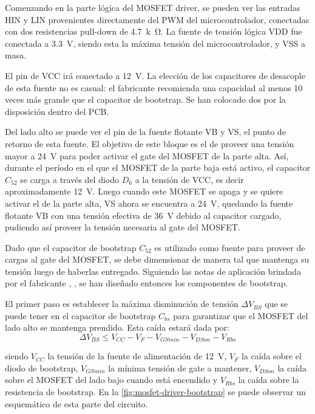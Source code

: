 \documentclass[titlepage, 12pt]{article}
\begin{document}
Comenzando en la parte lógica del MOSFET driver, se pueden ver las entradas HIN y LIN provenientes directamente del PWM del microcontrolador, conectadas con dos resistencias pull-down de \SI{4.7}{k\ohm}. La fuente de tensión lógica VDD fue conectada a \SI{3.3}{V}, siendo esta la máxima tensión del microcontrolador, y VSS a masa.

El pin de VCC irá conectado a \SI{12}{V}. La elección de los capacitores de desacople de esta fuente no es casual: el fabricante recomienda una capacidad al menos 10 veces más grande que el capacitor de bootstrap. Se han colocado dos por la disposición dentro del PCB.

Del lado alto se puede ver el pin de la fuente flotante VB y VS, el punto de retorno de esta fuente. El objetivo de este bloque es el de proveer una tensión mayor a \SI{24}{V} para poder activar el gate del MOSFET de la parte alta. Así, durante el período en el que el MOSFET de la parte baja está activo, el capacitor $C_{52}$ se carga a través del diodo $D_6$ a la tensión de VCC, es decir aproximadamente \SI{12}{V}. Luego cuando este MOSFET se apaga y se quiere activar el de la parte alta, VS ahora se encuentra a \SI{24}{V}, quedando la fuente flotante VB con una tensión efectiva de \SI{36}{V} debido al capacitor cargado, pudiendo así proveer la tensión necesaria al gate del MOSFET.

Dado que el capacitor de bootstrap $C_{52}$ es utilizado como fuente para proveer de cargas al gate del MOSFET, se debe dimensionar de manera tal que mantenga su tensión luego de haberlas entregado. Siguiendo las notas de aplicación brindada por el fabricante \cite{ir:dt04-04}, \cite{ir:an-978}, se han diseñado entonces los componentes de bootstrap.

El primer paso es establecer la máxima disminución de tensión $\Delta V_{BS}$ que se puede tener en el capacitor de bootstrap $C_{bs}$ para garantizar que el MOSFET del lado alto se mantenga prendido. Esta caída estará dada por:
    \begin{equation}
        \label{eq:bootstrap-deltavbs}
        \Delta V_{BS} \leq V_{CC} - V_F - V_{GS min} - V_{DS on} - V_{Rbs}
    \end{equation}

siendo $V_{CC}$ la tensión de la fuente de alimentación de \SI{12}{V}, $V_F$ la caída sobre el diodo de bootstrap, $V_{GS min}$ la mínima tensión de gate a mantener, $V_{DS on}$ la caída sobre el MOSFET del lado bajo cuando está encendido y $V_{Rbs}$ la caída sobre la resistencia de bootstrap. En la \autoref{fig:mosfet-driver-bootstrap} se puede observar un esquemático de esta parte del circuito.
\end{document}
